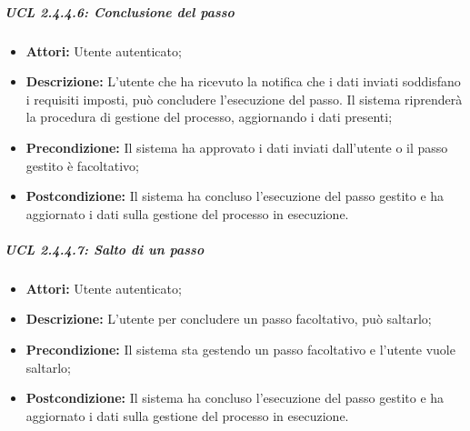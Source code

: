 \subparagraph{UCL 2.4.4.6: Conclusione del passo}
\begin{itemize}
\item \textbf{Attori:} Utente autenticato;
\item \textbf{Descrizione:} L'utente che ha ricevuto la notifica che i dati inviati soddisfano i requisiti imposti, può concludere l'esecuzione del passo. Il sistema riprenderà la procedura di gestione del processo, aggiornando i dati presenti;
\item \textbf{Precondizione:} Il sistema ha approvato i dati inviati dall'utente o il passo gestito è facoltativo;
\item \textbf{Postcondizione:} Il sistema ha concluso l'esecuzione del passo gestito e ha aggiornato i dati sulla gestione del processo in esecuzione.
\end{itemize}

\subparagraph{UCL 2.4.4.7: Salto di un passo}
\begin{itemize}
\item \textbf{Attori:} Utente autenticato;
\item \textbf{Descrizione:} L'utente per concludere un passo facoltativo, può saltarlo;
\item \textbf{Precondizione:} Il sistema sta gestendo un passo facoltativo e l'utente vuole saltarlo;
\item \textbf{Postcondizione:} Il sistema ha concluso l'esecuzione del passo gestito e ha aggiornato i dati sulla gestione del processo in esecuzione.
\end{itemize}

